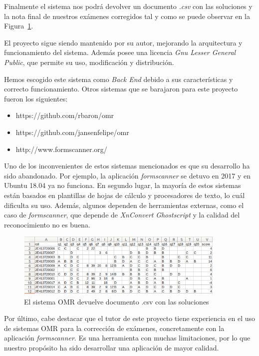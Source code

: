 \documentclass[a4paper, 12pt]{book}
\begin{document}
Finalmente el sistema nos podrá devolver un documento \textit{.csv} con
las soluciones y la nota final de nuestros exámenes corregidos tal y como
se puede observar en la Figura~\ref{figura:soluciones_omr}.

El proyecto sigue siendo mantenido por su autor, mejorando la arquitectura
y funcionamiento del sistema. Además posee una licencia
\textit{Gnu Lesser General Public}, que permite su uso, modificación y
distribución.

Hemos escogido este sistema como \textit{Back End} debido a sus características
y correcto funcionamiento. Otros sistemas que se barajaron para este proyecto
fueron los siguientes:

\begin{itemize}
  \item https://github.com/rbaron/omr
  \item https://github.com/jansenfelipe/omr
  \item http://www.formscanner.org/
\end{itemize}

Uno de los inconvenientes de estos sistemas mencionados es que su desarrollo
ha sido abandonado. Por ejemplo, la aplicación \textit{formscanner} se detuvo
en 2017 y en Ubuntu 18.04 ya no funciona.
En segundo lugar, la mayoría de estos sistemas están basados en plantillas de
hojas de cálculo
y procesadores de texto, lo cuál dificulta su uso. Además, algunos dependen
de herramientas externas, como el caso de \textit{formscanner}, que depende
de \textit{XnConvert} \textit{Ghostscript} y la calidad del reconocimiento
no es buena.


\begin{figure}
  \centering
  \includegraphics[width=10cm, keepaspectratio]{img/omr_3}
  \caption{El sistema OMR devuelve documento .csv con las soluciones}
  \label{figura:soluciones_omr}
\end{figure}

Por último, cabe destacar que el tutor de este proyecto tiene
experiencia en el uso de sistemas
OMR para la corrección de exámenes, concretamente con la
aplicación \textit{formscanner}. Es una herramienta con muchas
limitaciones, por lo que nuestro propósito ha sido
desarrollar una aplicación
de mayor calidad.
\end{document}
